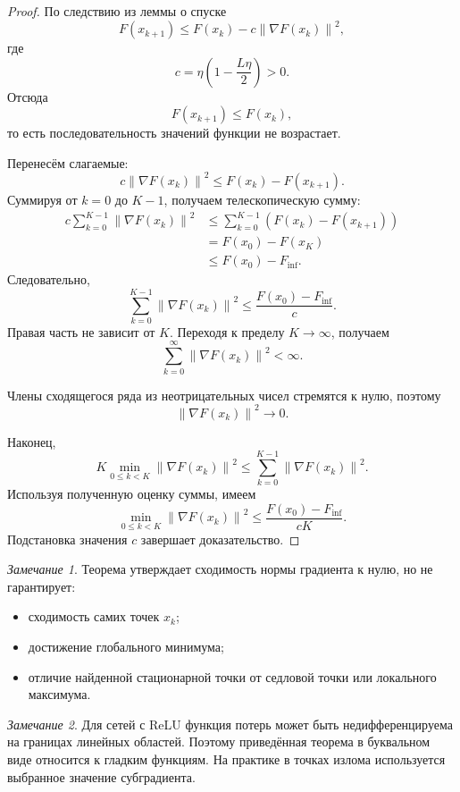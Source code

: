 \documentclass[12pt,a4paper]{article}
\theoremstyle{plain}
\theoremstyle{definition}
\theoremstyle{remark}
\newtheorem{remark}{Замечание}[section]
\newcommand{\norm}[1]{\left\lVert #1 \right\rVert}
\begin{document}
\begin{proof}
По следствию из леммы о спуске
\[
    F(x_{k+1})
    \leq
    F(x_k)
    -
    c\norm{\nabla F(x_k)}^2,
\]
где
\[
    c
    =
    \eta
    \left(
        1-\frac{L\eta}{2}
    \right)>0.
\]
Отсюда
\[
    F(x_{k+1})\leq F(x_k),
\]
то есть последовательность значений функции не возрастает.

Перенесём слагаемые:
\[
    c\norm{\nabla F(x_k)}^2
    \leq
    F(x_k)-F(x_{k+1}).
\]
Суммируя от $k=0$ до $K-1$, получаем телескопическую сумму:
\[
\begin{aligned}
    c\sum_{k=0}^{K-1}
    \norm{\nabla F(x_k)}^2
    &\leq
    \sum_{k=0}^{K-1}
    \left(
        F(x_k)-F(x_{k+1})
    \right)\\
    &=
    F(x_0)-F(x_K)\\
    &\leq
    F(x_0)-F_{\inf}.
\end{aligned}
\]
Следовательно,
\[
    \sum_{k=0}^{K-1}
    \norm{\nabla F(x_k)}^2
    \leq
    \frac{F(x_0)-F_{\inf}}{c}.
\]
Правая часть не зависит от $K$. Переходя к пределу
$K\to\infty$, получаем
\[
    \sum_{k=0}^{\infty}
    \norm{\nabla F(x_k)}^2<\infty.
\]

Члены сходящегося ряда из неотрицательных чисел стремятся к нулю,
поэтому
\[
    \norm{\nabla F(x_k)}^2\to 0.
\]

Наконец,
\[
    K
    \min_{0\leq k<K}
    \norm{\nabla F(x_k)}^2
    \leq
    \sum_{k=0}^{K-1}
    \norm{\nabla F(x_k)}^2.
\]
Используя полученную оценку суммы, имеем
\[
    \min_{0\leq k<K}
    \norm{\nabla F(x_k)}^2
    \leq
    \frac{
        F(x_0)-F_{\inf}
    }{
        cK
    }.
\]
Подстановка значения $c$ завершает доказательство.
\end{proof}

\begin{remark}
Теорема утверждает сходимость нормы градиента к нулю, но не
гарантирует:

\begin{itemize}
    \item сходимость самих точек $x_k$;
    \item достижение глобального минимума;
    \item отличие найденной стационарной точки от седловой точки
    или локального максимума.
\end{itemize}
\end{remark}

\begin{remark}
Для сетей с ReLU функция потерь может быть недифференцируема на
границах линейных областей. Поэтому приведённая теорема в буквальном
виде относится к гладким функциям. На практике в точках излома
используется выбранное значение субградиента.
\end{remark}
\end{document}
